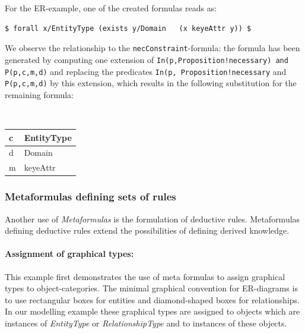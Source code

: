 For the ER-example, one of the created formulas reads as:

{\small
\begin{verbatim}
$ forall x/EntityType (exists y/Domain   (x keyeAttr y)) $
\end{verbatim}
}

We observe the relationship to the {\tt necConstraint}-formula:
the formula has been generated by computing one extension of
{\tt In(p,Proposition!necessary) and  P(p,c,m,d)} and
replacing the predicates {\tt In(p, Proposition!necessary} and {\tt P(p,c,m,d)} by this
extension, which
results in the following substitution for the remaining formula:



\begin{center}
{\tt
\begin{tabular} {|l|l|} \hline
c & EntityType \\ \hline
d & Domain  \\ \hline
m & keyeAttr \\ \hline
\end{tabular}
}
\end{center}

\subsubsection{Metaformulas defining sets of rules}
Another use of {\em Metaformulas} is the formulation of deductive
rules. Metaformulas defining deductive rules extend the possibilities
of defining derived knowledge.

\paragraph{Assignment  of graphical types:}
This example first demonstrates the use of meta formulas
to assign graphical types to object-categories. The
minimal graphical convention for ER-diagrams is to use
rectangular boxes for entities and diamond-shaped boxes
for relationships. In our modelling example these
graphical types are assigned to objects which are
instances of {\em EntityType} or {\em RelationshipType}
and to instances of these objects.

